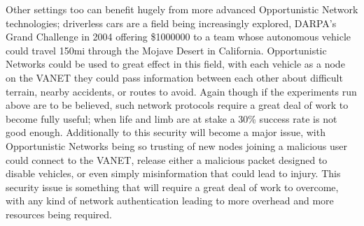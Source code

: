 \documentclass[12pt]{report}
\begin{document}
Other settings too can benefit hugely from more advanced Opportunistic Network technologies; driverless cars are a field being increasingly explored, DARPA's Grand Challenge in 2004 offering \$1000000 to a team whose autonomous vehicle could travel 150mi through the Mojave Desert in California\cite{darpachallenge}.
Opportunistic Networks could be used to great effect in this field, with each vehicle as a node on the VANET they could pass information between each other about difficult terrain, nearby accidents, or routes to avoid.
Again though if the experiments run above are to be believed, such network protocols require a great deal of work to become fully useful; when life and limb are at stake a 30\% success rate is not good enough.
Additionally to this security will become a major issue, with Opportunistic Networks being so trusting of new nodes joining a malicious user could connect to the VANET, release either a malicious packet designed to disable vehicles, or even simply misinformation that could lead to injury.
This security issue is something that will require a great deal of work to overcome, with any kind of network authentication leading to more overhead and more resources being required.
\end{document}
